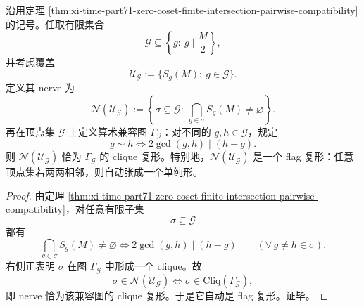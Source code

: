 \begin{corollary}\label{cor:xi-time-part71-zero-coset-nerve-flag}
沿用定理 \ref{thm:xi-time-part71-zero-coset-finite-intersection-pairwise-compatibility} 的记号。任取有限集合
\[
\mathcal G\subseteq
\left\{
g:\ g\mid \frac{M}{2}
\right\},
\]
并考虑覆盖
\[
\mathcal U_{\mathcal G}:=\{S_g(M):\ g\in\mathcal G\}.
\]
定义其 nerve 为
\[
\mathcal N(\mathcal U_{\mathcal G})
:=
\left\{
\sigma\subseteq \mathcal G:\ \bigcap_{g\in \sigma}S_g(M)\neq\varnothing
\right\}.
\]
再在顶点集 \(\mathcal G\) 上定义算术兼容图 \(\Gamma_{\mathcal G}\)：对不同的 \(g,h\in\mathcal G\)，规定
\[
g\sim h
\iff
2\gcd(g,h)\mid (h-g).
\]
则 \(\mathcal N(\mathcal U_{\mathcal G})\) 恰为 \(\Gamma_{\mathcal G}\) 的 clique 复形。特别地，\(\mathcal N(\mathcal U_{\mathcal G})\) 是一个 flag 复形：任意顶点集若两两相邻，则自动张成一个单纯形。
\end{corollary}
\begin{proof}
由定理 \ref{thm:xi-time-part71-zero-coset-finite-intersection-pairwise-compatibility}，对任意有限子集
\[
\sigma\subseteq \mathcal G
\]
都有
\[
\bigcap_{g\in \sigma}S_g(M)\neq\varnothing
\iff
2\gcd(g,h)\mid (h-g)
\qquad
(\forall\, g\neq h\in \sigma).
\]
右侧正表明 \(\sigma\) 在图 \(\Gamma_{\mathcal G}\) 中形成一个 clique。故
\[
\sigma\in \mathcal N(\mathcal U_{\mathcal G})
\iff
\sigma\in \mathrm{Cliq}(\Gamma_{\mathcal G}),
\]
即 nerve 恰为该兼容图的 clique 复形。于是它自动是 flag 复形。证毕。
\end{proof}

\endinput
